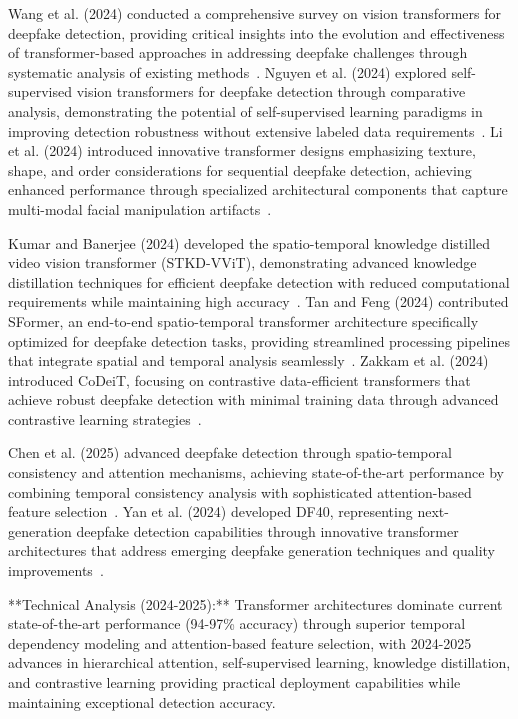 \documentclass[conference]{IEEEtran}
\begin{document}
Wang et al. (2024) conducted a comprehensive survey on vision transformers for deepfake detection, providing critical insights into the evolution and effectiveness of transformer-based approaches in addressing deepfake challenges through systematic analysis of existing methods~\cite{wang2024timely}. Nguyen et al. (2024) explored self-supervised vision transformers for deepfake detection through comparative analysis, demonstrating the potential of self-supervised learning paradigms in improving detection robustness without extensive labeled data requirements~\cite{nguyen2024selfsupervised}. Li et al. (2024) introduced innovative transformer designs emphasizing texture, shape, and order considerations for sequential deepfake detection, achieving enhanced performance through specialized architectural components that capture multi-modal facial manipulation artifacts~\cite{li2024texture}.

Kumar and Banerjee (2024) developed the spatio-temporal knowledge distilled video vision transformer (STKD-VViT), demonstrating advanced knowledge distillation techniques for efficient deepfake detection with reduced computational requirements while maintaining high accuracy~\cite{sciencedirect2024stkdvvit}. Tan and Feng (2024) contributed SFormer, an end-to-end spatio-temporal transformer architecture specifically optimized for deepfake detection tasks, providing streamlined processing pipelines that integrate spatial and temporal analysis seamlessly~\cite{sciencedirect2024sformer}. Zakkam et al. (2024) introduced CoDeiT, focusing on contrastive data-efficient transformers that achieve robust deepfake detection with minimal training data through advanced contrastive learning strategies~\cite{zakkam2024codeit}.

Chen et al. (2025) advanced deepfake detection through spatio-temporal consistency and attention mechanisms, achieving state-of-the-art performance by combining temporal consistency analysis with sophisticated attention-based feature selection~\cite{chen2025deepfake}. Yan et al. (2024) developed DF40, representing next-generation deepfake detection capabilities through innovative transformer architectures that address emerging deepfake generation techniques and quality improvements~\cite{yan2024df40}.

**Technical Analysis (2024-2025):** Transformer architectures dominate current state-of-the-art performance (94-97\% accuracy) through superior temporal dependency modeling and attention-based feature selection, with 2024-2025 advances in hierarchical attention, self-supervised learning, knowledge distillation, and contrastive learning providing practical deployment capabilities while maintaining exceptional detection accuracy.
\end{document}

